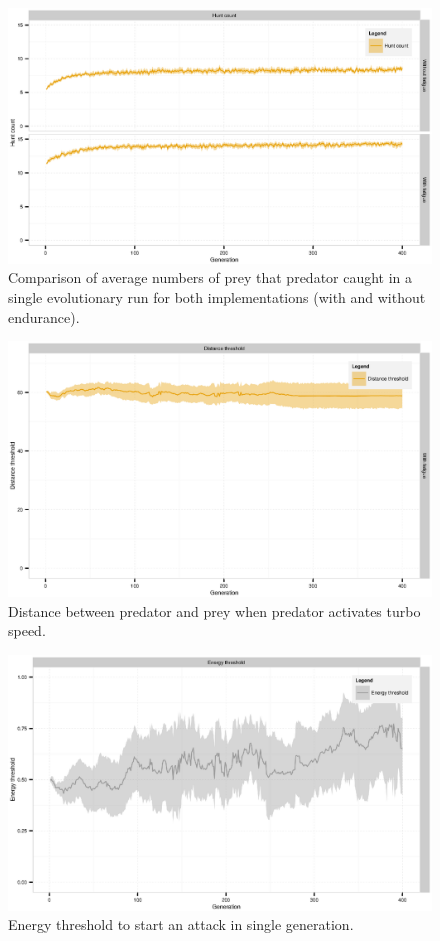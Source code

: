 \documentclass[internal]{FRIreport}
\begin{document}
\begin{figure}[H]
\centering
\includegraphics[scale=0.7]{hunt_success.eps}
\caption{Comparison of average numbers of prey that predator caught in a single evolutionary run for both implementations (with and without endurance).}
\label{ref:results1}
\end{figure} \hfill 

\begin{figure}[H]
\centering
\includegraphics[scale=0.7]{distance_graph.eps}
\caption{Distance between predator and prey when predator activates turbo speed.}
\label{ref:results2}
\end{figure} \hfill

\begin{figure}[H]
\centering
\includegraphics[scale=0.7]{energy_graph.eps}
\caption{Energy threshold to start an attack in single generation.}
\label{ref:results3}
\end{figure} \hfill 
\end{document}
